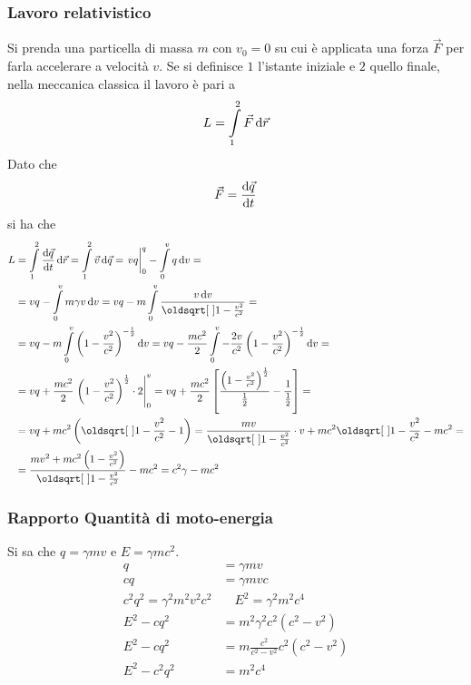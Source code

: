 \subsubsection{Lavoro relativistico}
Si prenda una particella di massa $m$ con $v_0=0$ su cui è applicata una forza $\vec{F}$ per farla
accelerare a velocità $v$. Se si definisce $1$ l'istante iniziale e $2$ quello finale, nella
meccanica classica il lavoro è pari a
\begin{equation*}
  L = \int\limits_{1}^{2} \vec{F}\mathop{}\!\mathrm{d}\vec{r}
\end{equation*}
Dato che
\begin{equation*}
  \vec{F} = \frac{\mathop{}\!\mathrm{d} \vec{q}}{\mathop{}\!\mathrm{d} t}
\end{equation*}
si ha che
\begin{align*}
  L &= \int\limits_{1}^{2} \der{\vec{q}}{t}\dif\vec{r}= \int\limits_{1}^{2}\vec{v}\dif\vec{q}=
  \left. \vphantom{\int}vq\right|_0^q-\int\limits_{0}^{v} q\dif v=\\
  &=vq-\int\limits_{0}^{v} m\gamma v\dif v=  
  vq-m \int\limits_{0}^{v} \frac{v\dif v}{\sqrt{1-\frac{v^2}{c^2}}}=\\
  &=vq-m \int\limits_{0}^{v} \left( 1-\frac{v^2}{c^2} \right)^{-\frac{1}{2}}\dif v=
  vq-\frac{mc^2}{2}
  \int\limits_{0}^{v} -\frac{2v}{c^2}\left( 1-\frac{v^2}{c^2} \right)^{-\frac{1}{2}}\dif v=\\
  &=vq+\frac{mc^2}{2}\left.\left( 1-\frac{v^2}{c^2}  \right)^{\frac{1}{2}}\cdot2\right|_0^v=
  vq+\frac{mc^2}{2} \left[ \frac{\left(1-\frac{v^2}{c^2}\right)^{\frac{1}{2}}}{\frac{1}{2}}-
  \frac{1}{\frac{1}{2}}\right]=\\
  &=vq+mc^2\left(\sqrt{1-\frac{v^2}{c^2}}-1\right)=\frac{mv}{\sqrt{1-\frac{v^2}{c^2}}}\cdot v+
  mc^2\sqrt{1-\frac{v^2}{c^2}}-mc^2=\\
  &=\frac{mv^2+mc^2\left( 1-\frac{v^2}{c^2} \right)}{\sqrt{1-\frac{v^2}{c^2}}}-mc^2=
  c^2\gamma-mc^2
\end{align*}

\subsubsection{Rapporto Quantità di moto-energia}
Si sa che $q=\gamma mv$ e $E=\gamma mc^2$.
\begin{align*}
  q&=\gamma mv\\
  cq&=\gamma mvc\\
  c^2q^2=\gamma^2m^2v^2c^2&\quad E^2=\gamma^2m^2c^4\\
  E^2-cq^2&=m^2\gamma^2c^2(c^2-v^2)\\
  E^2-cq^2&=m\frac{c^2}{c^2-v^2}c^2(c^2-v^2)\\
  E^2-c^2q^2&=m^2c^4
\end{align*}
